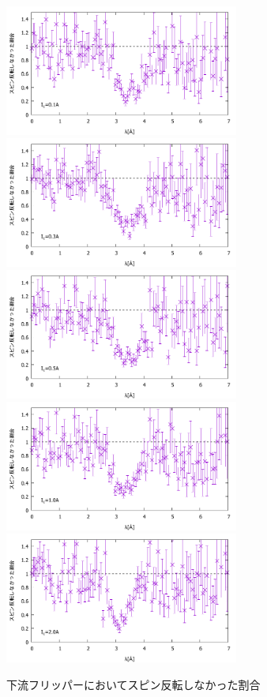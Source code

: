 \begin{figure}[h]
\includegraphics[height=4.3cm]{resonance/analysis/Flipper2_CountsRate_1A.pdf}
\includegraphics[height=4.3cm]{resonance/analysis/Flipper2_CountsRate_3A.pdf}\\
\includegraphics[height=4.3cm]{resonance/analysis/Flipper2_CountsRate_5A.pdf}
\includegraphics[height=4.3cm]{resonance/analysis/Flipper2_CountsRate_10A.pdf}\\
\includegraphics[height=4.3cm]{resonance/analysis/Flipper2_CountsRate_20A.pdf}
\caption{下流フリッパーにおいてスピン反転しなかった割合}\label{Resonance_fig_Flipper2_CountsRate}
\end{figure}

